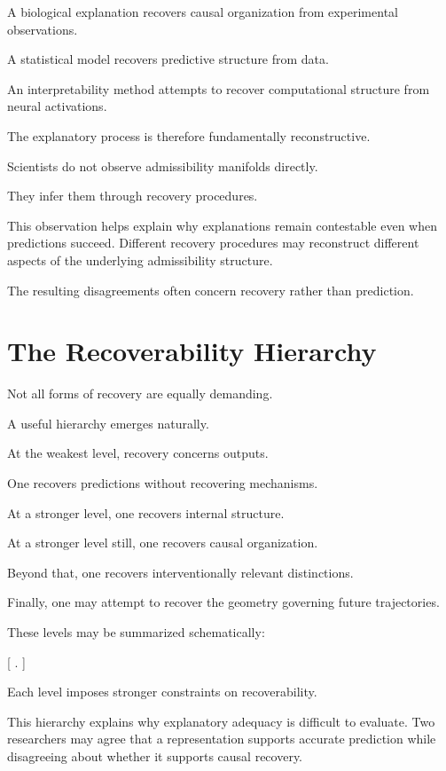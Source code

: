 \documentclass[11pt,oneside,openany]{book}
\begin{document}
A biological explanation recovers causal organization from experimental observations.

A statistical model recovers predictive structure from data.

An interpretability method attempts to recover computational structure from neural activations.

The explanatory process is therefore fundamentally reconstructive.

Scientists do not observe admissibility manifolds directly.

They infer them through recovery procedures.

This observation helps explain why explanations remain contestable even when predictions succeed. Different recovery procedures may reconstruct different aspects of the underlying admissibility structure.

The resulting disagreements often concern recovery rather than prediction.

\section{The Recoverability Hierarchy}

Not all forms of recovery are equally demanding.

A useful hierarchy emerges naturally.

At the weakest level, recovery concerns outputs.

One recovers predictions without recovering mechanisms.

At a stronger level, one recovers internal structure.

At a stronger level still, one recovers causal organization.

Beyond that, one recovers interventionally relevant distinctions.

Finally, one may attempt to recover the geometry governing future trajectories.

These levels may be summarized schematically:

[
\subset
{}
\subset
{}
\subset
{}
\subset
{}
\subset
{}.
]

Each level imposes stronger constraints on recoverability.

This hierarchy explains why explanatory adequacy is difficult to evaluate. Two researchers may agree that a representation supports accurate prediction while disagreeing about whether it supports causal recovery.
\end{document}
